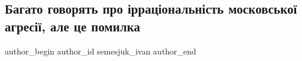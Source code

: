  
 
 
 
 
 
\subsection{Багато говорять про ірраціональність московської агресії, але це помилка}
\label{sec:08_03_2022.fb.semesjuk_ivan.1.moskov_agressia_pomylka}
 
\ifcmt
 author_begin
   author_id semesjuk_ivan
 author_end
\fi
